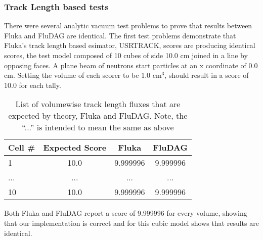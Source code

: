 \documentclass{anstrans}
\begin{document}
\subsubsection*{Track Length based tests}
There were several analytic vacuum test problems to prove that results
between Fluka and FluDAG are identical. The first test problems
demonstrate that Fluka's track length based esimator, USRTRACK, 
scores are producing identical scores, the test model composed of 
10 cubes of side 10.0 cm joined in a line by opposing faces. A plane 
beam of neutrons start particles at an x coordinate of 0.0 cm. Setting 
the volume of each scorer to be 1.0 cm$^3$, should result in a score of 
10.0 for each tally.
\begin{table}[h!]
	\begin{center}
		\begin{tabular}{|l|c|c|c|}
			\hline
			Cell \# & Expected Score & Fluka  & FluDAG \\
			\hline
			1 & 10.0 & 9.999996 & 9.999996 \\
			... & ... & ... & ... \\
			10 & 10.0 & 9.999996 & 9.999996 \\
			\hline
		\end{tabular}
	\caption{List of volumewise track length fluxes that are 
				expected by theory, Fluka and FluDAG. Note, the ``...''
				is intended to mean the same as above}
	\end{center}
	\label{usrtrack_comp}
\end{table}

Both Fluka and FluDAG report a score of 9.999996 for every volume,
showing that our implementation is correct and for this cubic model
shows that results are identical.
\end{document}
